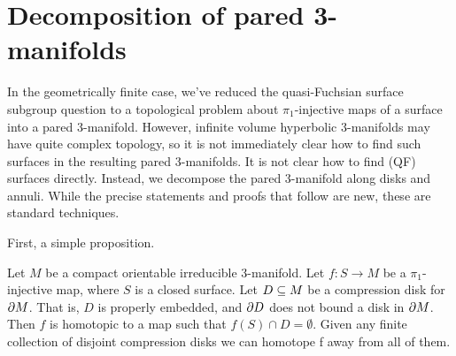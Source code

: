 \section{Decomposition of pared 3-manifolds}

In the geometrically finite case, we've reduced the quasi-Fuchsian surface
subgroup question to a topological problem about $\pi_1$-injective maps of
a surface into a pared 3-manifold. However, infinite volume hyperbolic
3-manifolds may have quite complex topology, so it is not immediately clear how
to find such surfaces in the resulting pared 3-manifolds. It is not clear how
to find (QF) surfaces directly. Instead, we decompose the pared 3-manifold
along disks and annuli. While the precise statements and proofs that follow are
new, these are standard techniques.



%

First, a simple proposition.

\begin{prop}

Let $M$ be a compact orientable irreducible 3-manifold. Let $f \colon S \to M$
be a $\pi_1$-injective map, where $S$ is a closed surface.  Let $D \subseteq M$ be
a compression disk for $\partial M$. That is, $D$ is properly embedded, and $\partial D$
does not bound a disk in $\partial M$. Then $f$ is homotopic to a map such that
$f(S) \cap D = \emptyset$. Given any finite collection of disjoint compression
disks we can homotope f away from all of them.

\end{prop}


